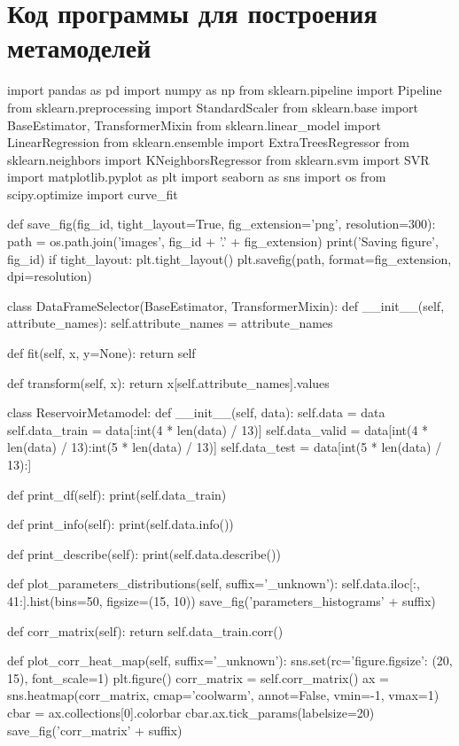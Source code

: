\chapter{Код программы для построения метамоделей}\label{appendix-MikTeX-TexStudio}

\begin{pythoncode}
import pandas as pd
import numpy as np
from sklearn.pipeline import Pipeline
from sklearn.preprocessing import StandardScaler
from sklearn.base import BaseEstimator, TransformerMixin
from sklearn.linear_model import LinearRegression
from sklearn.ensemble import ExtraTreesRegressor
from sklearn.neighbors import KNeighborsRegressor
from sklearn.svm import SVR
import matplotlib.pyplot as plt
import seaborn as sns
import os
from scipy.optimize import curve_fit


def save_fig(fig_id, tight_layout=True, fig_extension='png', resolution=300):
    path = os.path.join('images', fig_id + '.' + fig_extension)
    print('Saving figure', fig_id)
    if tight_layout:
        plt.tight_layout()
    plt.savefig(path, format=fig_extension, dpi=resolution)


class DataFrameSelector(BaseEstimator, TransformerMixin):
    def __init__(self, attribute_names):
        self.attribute_names = attribute_names

    def fit(self, x, y=None):
        return self

    def transform(self, x):
        return x[self.attribute_names].values


class ReservoirMetamodel:
    def __init__(self, data):
        self.data = data
        self.data_train = data[:int(4 * len(data) / 13)]
        self.data_valid = data[int(4 * len(data) / 13):int(5 * len(data) / 13)]
        self.data_test = data[int(5 * len(data) / 13):]

    def print_df(self):
        print(self.data_train)

    def print_info(self):
        print(self.data.info())

    def print_describe(self):
        print(self.data.describe())

    def plot_parameters_distributions(self, suffix='_unknown'):
        self.data.iloc[:, 41:].hist(bins=50, figsize=(15, 10))
        save_fig('parameters_histograms' + suffix)

    def corr_matrix(self):
        return self.data_train.corr()

    def plot_corr_heat_map(self, suffix='_unknown'):
        sns.set(rc={'figure.figsize': (20, 15)}, font_scale=1)
        plt.figure()
        corr_matrix = self.corr_matrix()
        ax = sns.heatmap(corr_matrix, cmap='coolwarm', annot=False, vmin=-1, vmax=1)
        cbar = ax.collections[0].colorbar
        cbar.ax.tick_params(labelsize=20)
        save_fig('corr_matrix' + suffix)


\end{pythoncode}
